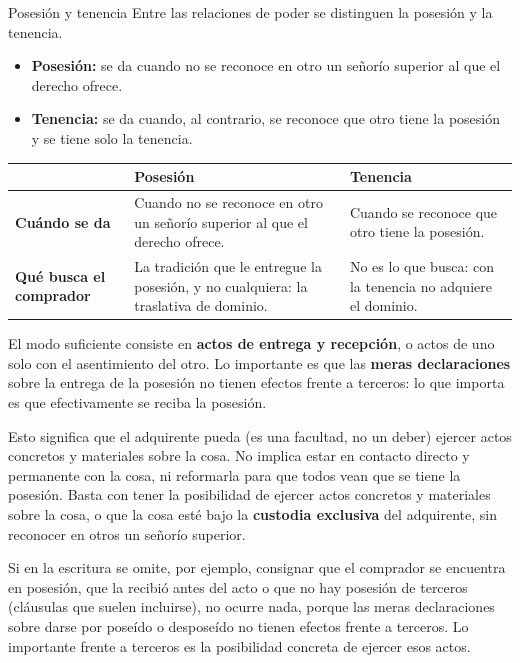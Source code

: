 \documentclass[12pt,oneside]{book}
\begin{document}
\begin{definition}{Posesión y tenencia}
Entre las relaciones de poder se distinguen la posesión y la tenencia.
\begin{itemize}
    \item \textbf{Posesión:} se da cuando no se reconoce en otro un señorío superior al que el derecho ofrece.
    \item \textbf{Tenencia:} se da cuando, al contrario, se reconoce que otro tiene la posesión y se tiene solo la tenencia.
\end{itemize}
\end{definition}

\begin{table}[H]
\centering
\small
\begin{tabularx}{\textwidth}{@{}>{\raggedright\arraybackslash}p{}>{\raggedright\arraybackslash}X>{\raggedright\arraybackslash}X@{}}
\toprule
 & \textbf{Posesión} & \textbf{Tenencia} \\
\midrule
\textbf{Cuándo se da} & Cuando no se reconoce en otro un señorío superior al que el derecho ofrece. & Cuando se reconoce que otro tiene la posesión. \\
\textbf{Qué busca el comprador} & La tradición que le entregue la posesión, y no cualquiera: la traslativa de dominio. & No es lo que busca: con la tenencia no adquiere el dominio. \\
\bottomrule
\end{tabularx}
\end{table}

El modo suficiente consiste en \textbf{actos de entrega y recepción}, o actos de uno solo con el asentimiento del otro. Lo importante es que las \textbf{meras declaraciones} sobre la entrega de la posesión no tienen efectos frente a terceros: lo que importa es que efectivamente se reciba la posesión.

Esto significa que el adquirente pueda (es una facultad, no un deber) ejercer actos concretos y materiales sobre la cosa. No implica estar en contacto directo y permanente con la cosa, ni reformarla para que todos vean que se tiene la posesión. Basta con tener la posibilidad de ejercer actos concretos y materiales sobre la cosa, o que la cosa esté bajo la \textbf{custodia exclusiva} del adquirente, sin reconocer en otros un señorío superior.

Si en la escritura se omite, por ejemplo, consignar que el comprador se encuentra en posesión, que la recibió antes del acto o que no hay posesión de terceros (cláusulas que suelen incluirse), no ocurre nada, porque las meras declaraciones sobre darse por poseído o desposeído no tienen efectos frente a terceros. Lo importante frente a terceros es la posibilidad concreta de ejercer esos actos.
\end{document}
